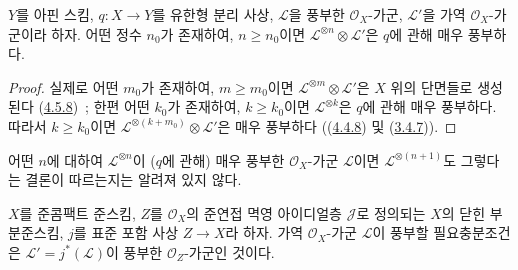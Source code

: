 \begin{corollary}[4.5.11]
\label{II.4.5.11-ko}
$Y$를 아핀 스킴, $q:X\to Y$를 유한형 분리 사상,
$\mathcal{L}$을 풍부한 $\mathcal{O}_X$-가군,
$\mathcal{L}'$을 가역 $\mathcal{O}_X$-가군이라 하자. 어떤 정수
$n_0$가 존재하여, $n\geq n_0$이면
$\mathcal{L}^{\otimes n}\otimes\mathcal{L}'$은 $q$에 관해 매우 풍부하다.
\end{corollary}

\begin{proof}
실제로 어떤 $m_0$가 존재하여, $m\geq m_0$이면
$\mathcal{L}^{\otimes m}\otimes\mathcal{L}'$은 $X$ 위의 단면들로
생성된다 (\hyperref[II.4.5.8-ko]{4.5.8})~; 한편 어떤 $k_0$가 존재하여,
$k\geq k_0$이면 $\mathcal{L}^{\otimes k}$은 $q$에 관해 매우 풍부하다.
따라서 $k\geq k_0$이면
$\mathcal{L}^{\otimes(k+m_0)}\otimes\mathcal{L}'$은 매우 풍부하다
((\hyperref[II.4.4.8-ko]{4.4.8}) 및
(\hyperref[II.3.4.7-ko]{3.4.7})).
\end{proof}

\begin{remark}[4.5.12]
\label{II.4.5.12-ko}
어떤 $n$에 대하여 $\mathcal{L}^{\otimes n}$이 ($q$에 관해) 매우
풍부한 $\mathcal{O}_X$-가군 $\mathcal{L}$이면
$\mathcal{L}^{\otimes(n+1)}$도 그렇다는 결론이 따르는지는 알려져 있지
않다.
\end{remark}

\begin{proposition}[4.5.13]
\label{II.4.5.13-ko}
$X$를 준콤팩트 준스킴, $Z$를 $\mathcal{O}_X$의 준연접 멱영 아이디얼층
$\mathcal{J}$로 정의되는 $X$의 닫힌 부분준스킴, $j$를 표준 포함 사상
$Z\to X$라 하자. 가역 $\mathcal{O}_X$-가군 $\mathcal{L}$이 풍부할
필요충분조건은 $\mathcal{L}'=j^*(\mathcal{L})$이 풍부한
$\mathcal{O}_Z$-가군인 것이다.
\end{proposition}

